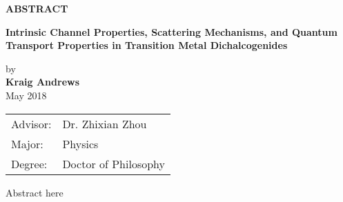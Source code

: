 
\begin{center}
\textbf{ABSTRACT}
	
	
	\singlespacing
\textbf{Intrinsic Channel Properties, Scattering Mechanisms, and Quantum Transport Properties in Transition Metal Dichalcogenides}\\
	\doublespacing
	
	by\\
	
	\textbf{Kraig Andrews}\\
	May 2018\\
\end{center}
\begin{tabular}{ll}	
Advisor: &Dr. Zhixian Zhou\\
Major:   &Physics\\
Degree:  &Doctor of Philosophy
\end{tabular}
\bigskip

Abstract here

